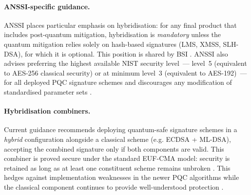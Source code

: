 \paragraph{ANSSI-specific guidance.}
ANSSI \cite{anssi_post_quantum_crypto} places particular emphasis on hybridisation: for any final product that includes post-quantum mitigation, hybridisation is \emph{mandatory} unless the quantum mitigation relies solely on hash-based signatures (LMS, XMSS, SLH-DSA), for which it is optional. This position is shared by BSI \cite{bsi_crypto_key_length}. ANSSI also advises preferring the highest available NIST security level~--- level~5 (equivalent to AES-256 classical security) or at minimum level~3 (equivalent to AES-192)~--- for all deployed PQC signature schemes and discourages any modification of standardised parameter sets \cite{anssi_post_quantum_crypto}.

\paragraph{Hybridisation combiners.}
Current guidance recommends deploying quantum-safe signature schemes in a \emph{hybrid} configuration alongside a classical scheme (e.g. ECDSA + ML-DSA), accepting the combined signature only if both components are valid. This combiner is proved secure under the standard EUF-CMA model: security is retained as long as at least one constituent scheme remains unbroken \cite{anssi_post_quantum_crypto}. This hedges against implementation weaknesses in the newer PQC algorithms while the classical component continues to provide well-understood protection \cite{bsi_crypto_key_length}.